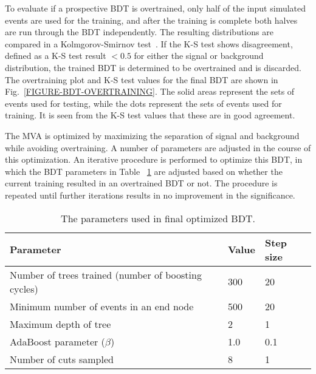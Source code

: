 To evaluate if a prospective BDT is overtrained, only half of the input simulated events are used for the training, and after the training is complete both halves are run through the BDT independently. The resulting distributions are compared in a Kolmgorov-Smirnov test~\cite{KS}. If the K-S test shows disagreement, defined as a K-S test result $< 0.5$ for either the signal or background distribution, the trained BDT is determined to be overtrained and is discarded. The overtraining plot and K-S test values for the final BDT are shown in Fig.~\ref{FIGURE-BDT-OVERTRAINING}. The solid areas represent the sets of events used for testing, while the dots represent the sets of events used for training. It is seen from the K-S test values that these are in good agreement.


The MVA is optimized by maximizing the separation of signal and background while avoiding overtraining. A number of parameters are adjusted in the course of this optimization. An iterative procedure is performed to optimize this BDT, in which the BDT parameters in Table ~\ref{TABLE-BDT-PARAMETERS} are adjusted based on whether the current training resulted in an overtrained BDT or not. The procedure is repeated until further iterations results in no improvement in the significance. 

\begin{table}[phtb]
  \begin{center}
    \begin{tabular}{|m{5cm}|l|l|}
      \hline
      Parameter       &  Value  & Step size\\
      \hline \hline
      Number of trees trained (number of boosting cycles) & 300 & 20 \\ \hline
      Minimum number of events in an end node & 500 & 20\\ \hline
      Maximum depth of tree & 2 & 1 \\ \hline
      AdaBoost parameter ($\beta$) & 1.0 & 0.1 \\ \hline
      Number of cuts sampled & 8 & 1\\ \hline
      \hline
    \end{tabular}
    \caption{The parameters used in final optimized BDT.}
    \label{TABLE-BDT-PARAMETERS}
  \end{center}
\end{table}

